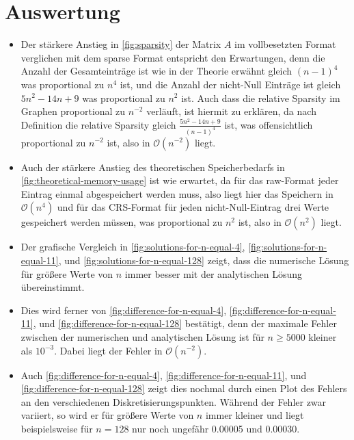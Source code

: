 \documentclass{scrartcl}
\newcommand\BigO{\mathcal{O}}
\begin{document}
\section{Auswertung}

\begin{itemize}
    \item Der stärkere Anstieg in \autoref{fig:sparsity} der Matrix \(A\) im
          vollbesetzten Format verglichen mit dem sparse Format entspricht den
          Erwartungen, denn die Anzahl der Gesamteinträge ist wie in der
          Theorie erwähnt gleich \({(n - 1)}^4\) was proportional zu \(n^4\)
          ist, und die Anzahl der nicht-Null Einträge ist gleich \(5n^2 - 14n +
          9\) was proportional zu \(n^2\) ist. Auch dass die relative Sparsity
          im Graphen proportional zu \(n^{-2}\) verläuft, ist hiermit zu
          erklären, da nach Definition die relative Sparsity gleich
          \(\frac{5n^2 - 14n + 9}{{(n - 1)}^4}\) ist, was offensichtlich
          proportional zu \(n^{-2}\) ist, also in \(\BigO(n^{-2})\) liegt.

    \item Auch der stärkere Anstieg des theoretischen Speicherbedarfs in
          \autoref{fig:theoretical-memory-usage} ist wie erwartet, da für das
          raw-Format jeder Eintrag einmal abgespeichert werden muss, also liegt
          hier das Speichern in \(\BigO(n^4)\) und für das CRS-Format für jeden
          nicht-Null-Eintrag drei Werte gespeichert werden müssen, was
          proportional zu \(n^2\) ist, also in \(\BigO(n^2)\) liegt.

    \item Der grafische Vergleich in \autoref{fig:solutions-for-n-equal-4},
          \autoref{fig:solutions-for-n-equal-11}, und
          \autoref{fig:solutions-for-n-equal-128} zeigt, dass die numerische
          Lösung für größere Werte von \(n\) immer besser mit der analytischen
          Lösung übereinstimmt.

    \item Dies wird ferner von \autoref{fig:difference-for-n-equal-4},
          \autoref{fig:difference-for-n-equal-11}, und
          \autoref{fig:difference-for-n-equal-128} bestätigt, denn der maximale
          Fehler zwischen der numerischen und analytischen Lösung ist für \(n
          \geqslant 5000\) kleiner als \(10^{-3}\). Dabei liegt der Fehler in
          \(\BigO(n^{-2})\).

    \item Auch \autoref{fig:difference-for-n-equal-4},
          \autoref{fig:difference-for-n-equal-11}, und
          \autoref{fig:difference-for-n-equal-128} zeigt dies nochmal durch
          einen Plot des Fehlers an den verschiedenen Diskretisierungspunkten.
          Während der Fehler zwar variiert, so wird er für größere Werte von
          \(n\) immer kleiner und liegt beispielsweise für \(n = 128\) nur noch
          ungefähr 0.00005 und 0.00030.


\end{itemize}
\end{document}
